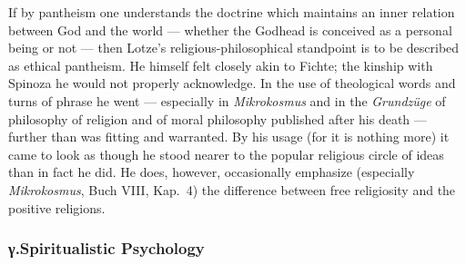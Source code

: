 \documentclass[12pt,a4paper]{book}
\begin{document}
If by pantheism one understands the doctrine which maintains an inner relation
between God and the world --- whether the Godhead is conceived as a personal
being or not --- then Lotze's religious-philosophical standpoint is to be
described as ethical pantheism. He himself felt closely akin to Fichte; the
kinship with Spinoza he would not properly acknowledge. In the use of theological
words and turns of phrase he went --- especially in \textit{Mikrokosmus} and in
the \textit{Grundzüge} of philosophy of religion and of moral philosophy
published after his death --- further than was fitting and warranted. By his
usage (for it is nothing more) it came to look as though he stood nearer to the
popular religious circle of ideas than in fact he did. He does, however,
occasionally emphasize (especially \textit{Mikrokosmus}, Buch VIII, Kap.~4) the
difference between free religiosity and the positive religions.

\subsubsection*{γ.\quad Spiritualistic Psychology}
\end{document}
